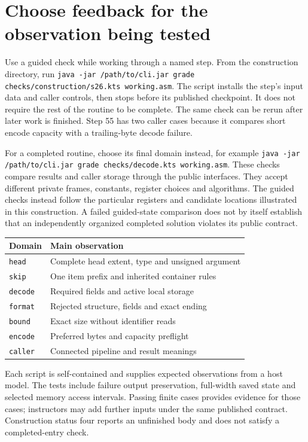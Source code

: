 \section{Choose feedback for the observation being tested}
Use a guided check while working through a named step. From the construction directory,
run \texttt{java -jar /path/to/cli.jar grade checks/construction/s26.kts working.asm}.
The script installs the step's input data and caller controls, then stops before its
published checkpoint. It does not require the rest of the routine to be complete.
The same check can be rerun after later work is finished. Step 55 has two caller cases
because it compares short encode capacity with a trailing-byte decode failure.

For a completed routine, choose its final domain instead, for example
\texttt{java -jar /path/to/cli.jar grade checks/decode.kts working.asm}.
These checks compare results and caller storage through the public interfaces. They
accept different private frames, constants, register choices and algorithms. The guided
checks instead follow the particular registers and candidate locations illustrated in
this construction. A failed guided-state comparison does not by itself establish that
an independently organized completed solution violates its public contract.

\begin{center}
  \begin{tabular}{ll}
    Domain          & Main observation                                 \\
    \hline
    \texttt{head}   & Complete head extent, type and unsigned argument \\
    \texttt{skip}   & One item prefix and inherited container rules    \\
    \texttt{decode} & Required fields and active local storage         \\
    \texttt{format} & Rejected structure, fields and exact ending      \\
    \texttt{bound}  & Exact size without identifier reads              \\
    \texttt{encode} & Preferred bytes and capacity preflight           \\
    \texttt{caller} & Connected pipeline and result meanings           \\
  \end{tabular}
\end{center}

Each script is self-contained and supplies expected observations from a host model.
The tests include failure output preservation, full-width saved state and selected
memory access intervals. Passing finite cases provides evidence for those cases;
instructors may add further inputs under the same published contract. Construction
status four reports an unfinished body and does not satisfy a completed-entry check.
